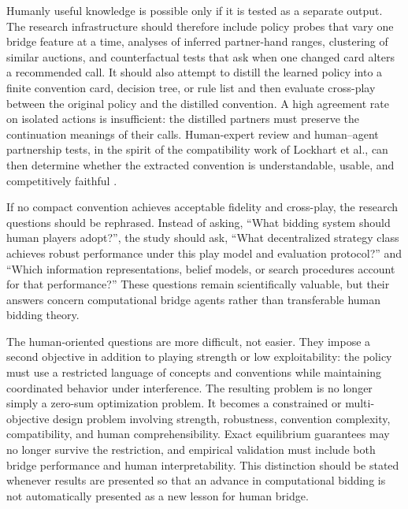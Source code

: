 \documentclass[11pt]{article}
\begin{document}
Humanly useful knowledge is possible only if it is tested as a separate output. The research infrastructure should therefore include policy probes that vary one bridge feature at a time, analyses of inferred partner-hand ranges, clustering of similar auctions, and counterfactual tests that ask when one changed card alters a recommended call. It should also attempt to distill the learned policy into a finite convention card, decision tree, or rule list and then evaluate cross-play between the original policy and the distilled convention. A high agreement rate on isolated actions is insufficient: the distilled partners must preserve the continuation meanings of their calls. Human-expert review and human--agent partnership tests, in the spirit of the compatibility work of Lockhart et al., can then determine whether the extracted convention is understandable, usable, and competitively faithful \cite{lockhart2020human}.

If no compact convention achieves acceptable fidelity and cross-play, the research questions should be rephrased. Instead of asking, ``What bidding system should human players adopt?'', the study should ask, ``What decentralized strategy class achieves robust performance under this play model and evaluation protocol?'' and ``Which information representations, belief models, or search procedures account for that performance?'' These questions remain scientifically valuable, but their answers concern computational bridge agents rather than transferable human bidding theory.

The human-oriented questions are more difficult, not easier. They impose a second objective in addition to playing strength or low exploitability: the policy must use a restricted language of concepts and conventions while maintaining coordinated behavior under interference. The resulting problem is no longer simply a zero-sum optimization problem. It becomes a constrained or multi-objective design problem involving strength, robustness, convention complexity, compatibility, and human comprehensibility. Exact equilibrium guarantees may no longer survive the restriction, and empirical validation must include both bridge performance and human interpretability. This distinction should be stated whenever results are presented so that an advance in computational bidding is not automatically presented as a new lesson for human bridge.



\appendix






\end{document}
